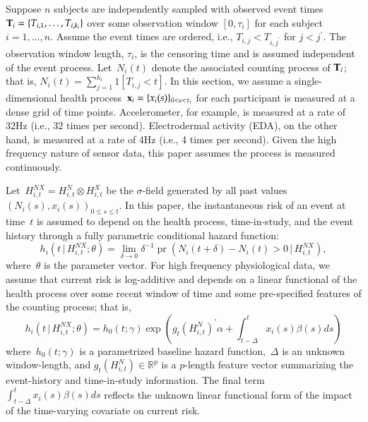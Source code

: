 \documentclass[11pt]{amsart}
\def\pr{\mathop{\text{pr}}\nolimits}
\def\pr{\mathop{\text{pr}}\nolimits}
\def\given{\, | \,}
\def\Given{\, \big | \,}
\def\bfx{{\bf x}}
\def\bfT{{\bf T}}
\begin{document}
Suppose $n$ subjects are independently sampled with observed event times~$\bfT_{i} = \{ T_{i,1}, \ldots, T_{i,k_i}\}$ over some observation window $[0, \tau_i]$ for each subject $i = 1,\ldots, n$.  Assume the event times are ordered, i.e., $T_{i,j} < T_{i,j^\prime}$ for $j < j^\prime$. The observation window length, $\tau_i$, is the censoring time and is assumed independent of the event process. Let~$N_{i} (t)$ denote the associated counting process of $\bfT_{i}$; that is, $N_i (t) = \sum_{j=1}^{k_i} 1 [ T_{i,j} < t ]$. In this section, we assume a single-dimensional health process~$\bfx_i = \{ x_i (s) \}_{0 < s < \tau_i}$ for each participant is measured at a dense grid of time points.  Accelerometer, for example, is measured at a rate of 32Hz (i.e., $32$ times per second). Electrodermal activity (EDA), on the other hand, is measured at a rate of 4Hz (i.e., 4 times per second).  Given the high frequency nature of sensor data, this paper assumes the process is measured continuously.

Let~$H_{i,t}^{NX} = H_{i,t}^{N} \otimes H_{i,t}^{X}$ be the $\sigma$-field generated by all past values~$(N_i (s), x_i (s))_{0 \leq s \leq t}$. In this paper, the instantaneous risk of an event at time~$t$ is assumed to depend on the health process, time-in-study, and the event history through a fully parametric conditional hazard function:
\begin{equation}
\label{eq:hazard}
h_i \left( t \Given H_{i,t}^{NX} ; \theta \right) =
\lim_{\delta \to 0} \delta^{-1} \pr \left( N_i(t+\delta) - N_i(t) > 0
  \given H_{i,t}^{NX} \right),
\end{equation}
where~$\theta$ is the parameter vector. For high frequency physiological data, we assume that current risk is log-additive and depends on a linear functional of the health process over some recent window of time and some pre-specified features of the counting process; that is,
\begin{equation}
\label{eq:hazardlinear}
h_i \left( t \given  H_{i,t}^{NX} ; \theta \right) =
h_0 (t; \gamma) \exp \left( g_t \left( H_{i,t}^{N} \right)^{\prime} \alpha
  + \int_{t-\Delta}^t x_i (s) \beta(s) ds  \right)
\end{equation}
where~$h_0(t;\gamma)$ is a parametrized baseline hazard function,~$\Delta$ is an unknown window-length, and $g_t( H_{i,t}^N ) \in \mathbb{R}^p$ is a $p$-length feature vector summarizing the event-history and time-in-study information. The final term~$\int_{t-\Delta}^t x_i(s) \beta(s) ds$ reflects the unknown linear functional form of the impact of the time-varying covariate on current risk.
\end{document}
